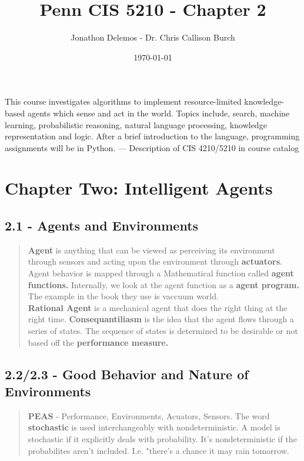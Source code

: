 \documentclass{article}
\title{Penn CIS 5210 - Chapter 2}
\author{Jonathon Delemos - Dr. Chris Callison Burch}
\date{\today}
\begin{document}
\maketitle

This course investigates algorithms to implement resource-limited knowledge-based agents which
sense and act in the world. Topics include, search, machine learning, probabilistic reasoning, natural
language processing, knowledge representation and logic. After a brief introduction to the language,
programming assignments will be in Python.
— Description of CIS 4210/5210 in course catalog

\section{Chapter Two: Intelligent Agents}
\subsection{2.1 - Agents and Environments}
\begin{quote}
    \textbf{Agent} is anything that can be viewed as perceiving its environment through sensors and acting upon the environment through \textbf{actuators}.
    Agent behavior is mapped through a Mathematical function called \textbf{agent functions.} Internally, we look at the agent function as a \textbf{agent program.}
    The example in the book they use is vaccuum world. \\ \textbf{Rational Agent} is a mechanical agent that does the right thing at the right time.
    \textbf{Consequantiliasm} is the idea that the agent flows through a series of states. The sequence of states is determined to be desirable or not based off the \textbf{performance measure.}

\end{quote}
\subsection{2.2/2.3 - Good Behavior and Nature of Environments}
\begin{quote}
    \textbf{PEAS} - Performance, Environments, Acuators, Sensors. The word \textbf{stochastic} is used interchangeably with nondeterministic. A model is stochastic
    if it explicitly deals with probability. It's nondeterministic if the probabilites aren't included. I.e. "there's a chance it may rain tomorrow.
\end{quote}
\end{document}
